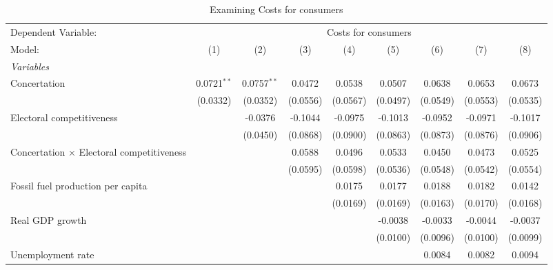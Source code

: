 
\begin{table}[htbp]
   \caption{Examining Costs for consumers}
   \centering
   \begin{tabular}{lcccccccc}
      \tabularnewline \midrule \midrule
      Dependent Variable: & \multicolumn{8}{c}{Costs for consumers}\\
      Model:                                           & (1)           & (2)           & (3)      & (4)      & (5)      & (6)      & (7)      & (8)\\  
      \midrule
      \emph{Variables}\\
      Concertation                                     & 0.0721$^{**}$ & 0.0757$^{**}$ & 0.0472   & 0.0538   & 0.0507   & 0.0638   & 0.0653   & 0.0673\\   
                                                       & (0.0332)      & (0.0352)      & (0.0556) & (0.0567) & (0.0497) & (0.0549) & (0.0553) & (0.0535)\\   
      Electoral competitiveness                        &               & -0.0376       & -0.1044  & -0.0975  & -0.1013  & -0.0952  & -0.0971  & -0.1017\\   
                                                       &               & (0.0450)      & (0.0868) & (0.0900) & (0.0863) & (0.0873) & (0.0876) & (0.0906)\\   
      Concertation $\times$ Electoral competitiveness  &               &               & 0.0588   & 0.0496   & 0.0533   & 0.0450   & 0.0473   & 0.0525\\   
                                                       &               &               & (0.0595) & (0.0598) & (0.0536) & (0.0548) & (0.0542) & (0.0554)\\   
      Fossil fuel production per capita                &               &               &          & 0.0175   & 0.0177   & 0.0188   & 0.0182   & 0.0142\\   
                                                       &               &               &          & (0.0169) & (0.0169) & (0.0163) & (0.0170) & (0.0168)\\   
      Real GDP growth                                  &               &               &          &          & -0.0038  & -0.0033  & -0.0044  & -0.0037\\   
                                                       &               &               &          &          & (0.0100) & (0.0096) & (0.0100) & (0.0099)\\   
      Unemployment rate                                &               &               &          &          &          & 0.0084   & 0.0082   & 0.0094\\   

\end{tabular}
\end{table}
